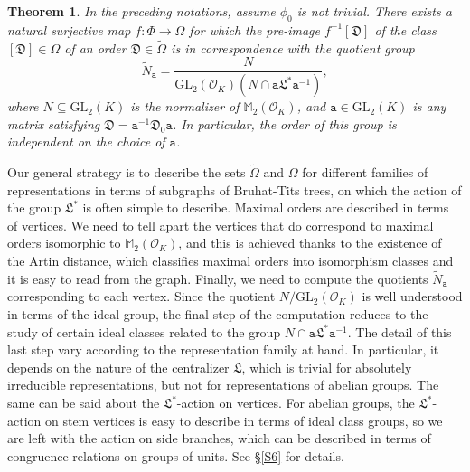 \documentclass{article}
\newtheorem{Thm}{Theorem}
\theoremstyle{definition}
\theoremstyle{remark}
\begin{document}
\begin{Thm}\label{percc}
    In the preceding notations, assume 
    $\phi_0$ is not trivial.
    There exists a natural surjective map 
    $f:\Phi\rightarrow\Omega$ for which
    the pre-image $f^{-1}[\mathfrak{D}]$
    of the class $[\mathfrak{D}]\in\Omega$ 
    of an order
    $\mathfrak{D}\in\tilde{\Omega}$ 
    is in correspondence 
    with the quotient group 
    \begin{equation}\label{defna}
        \tilde{N}_\mathtt{a}=\frac{N}{
        \mathrm{GL}_2(\mathcal{O}_K)(N\cap 
        \mathtt{a}\mathfrak{L}^*\mathtt{a}^{-1})},
    \end{equation}
    where $N\subseteq\mathrm{GL}_2(K)$ is the normalizer of $\mathbb{M}_2(\mathcal{O}_K)$, and 
    $\mathtt{a}\in\mathrm{GL}_2(K)$ is any matrix satisfying
    $\mathfrak{D}=\mathtt{a}^{-1}\mathfrak{D}_0 \mathtt{a}$.
    In particular, the order of this group is independent on 
    the choice of $\mathtt{a}$.
\end{Thm}

Our general strategy is to describe the sets $\tilde{\Omega}$
and $\Omega$ for different families of representations in terms
of subgraphs of Bruhat-Tits trees, on which the action of
the group $\mathfrak{L}^*$ is often simple to describe.
Maximal orders are described in terms of vertices. We need
to tell apart the vertices that do correspond to maximal orders
isomorphic to $\mathbb{M}_2(\mathcal{O}_K)$, and this
is achieved thanks to the existence of the Artin distance, 
which classifies maximal orders into isomorphism 
classes and it is easy to read from the graph. Finally,
we need to compute the quotients $\tilde{N}_\mathtt{a}$
corresponding to each vertex. Since the quotient 
$N/\mathrm{GL}_2(\mathcal{O}_K)$ is well understood in terms
of the ideal group, the final step of the computation
reduces to the study of certain ideal classes related
to the group $N\cap\mathtt{a}\mathfrak{L}^*\mathtt{a}^{-1}$.
The detail of this last step vary according to the 
representation family at hand. In particular, it depends
on the nature of the centralizer $\mathfrak{L}$, which is
trivial for absolutely irreducible representations, but not
for representations of abelian groups. The same can be said
about the $\mathfrak{L}^*$-action on vertices. For abelian
groups, the $\mathfrak{L}^*$-action on stem vertices is easy 
to describe in terms of ideal class groups, so we are
left with the action on side branches, which can be 
described in terms of congruence relations on groups of units.
See \S\ref{S6} for details.
\end{document}
